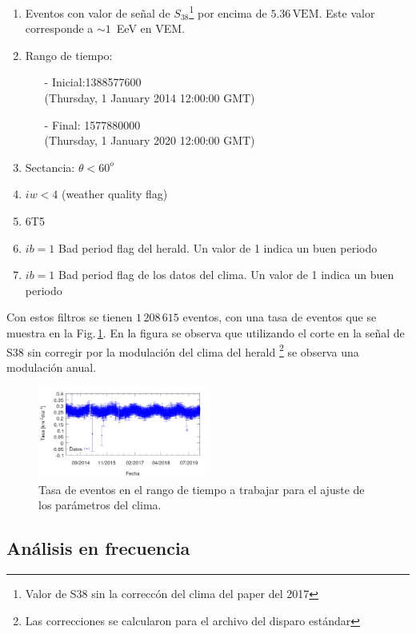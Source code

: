 \begin{enumerate}
	\item Eventos con valor de señal de $S_{38}$\footnote{Valor de S38 sin la correccón del clima del paper del 2017} por encima de  $5.36\,\text{VEM}$. Este valor corresponde a $\sim 1\,$ EeV  en VEM.
	\item Rango de tiempo:
	\begin{itemize}
		\item[-] Inicial:1388577600 \\ (Thursday, 1 January 2014 12:00:00 GMT)
		\item[-] Final: 1577880000  \\ (Thursday, 1 January 2020 12:00:00 GMT)
	\end{itemize}
	\item Sectancia:  $\theta < 60^o$
	\item $iw<4$ (weather quality flag)
	\item 6T5
	\item $ib=1$ Bad period flag del herald.  Un valor de 1 indica un buen periodo
	\item $ib=1$ Bad period flag de los datos del clima. Un valor de 1 indica un buen periodo
\end{enumerate}


Con estos filtros se tienen $1\,208\,615$ eventos, con una tasa de eventos que se muestra en la Fig.\,\ref{tasa_total_diaria_ajuste_weather}. En la figura se observa que utilizando el corte en la señal de S38 sin corregir por la modulación del clima del herald \footnote{Las correcciones se calcularon para el archivo del disparo estándar} se observa una modulación anual.

\begin{figure}[H]
	\centering
	\includegraphics[width=0.5\textwidth]{rate_total_ajuste_weather.png}
	\caption{Tasa  de eventos en el rango de tiempo a trabajar para el ajuste de los parámetros del clima.}
	\label{tasa_total_diaria_ajuste_weather}
\end{figure}


\subsection{Análisis en frecuencia}

